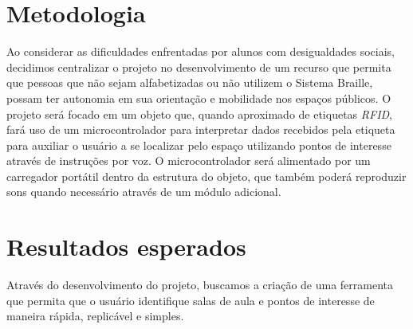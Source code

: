 \documentclass{article}
\begin{document}
\section{Metodologia}
Ao considerar as dificuldades enfrentadas por alunos com desigualdades sociais, decidimos centralizar o projeto no desenvolvimento de um recurso que permita que pessoas que não sejam alfabetizadas ou não utilizem o Sistema Braille, possam ter autonomia em sua orientação e mobilidade nos espaços públicos.
O projeto será focado em um objeto que, quando aproximado de etiquetas \emph{RFID}, fará uso de um microcontrolador para interpretar dados recebidos pela etiqueta para auxiliar o usuário a se localizar pelo espaço utilizando pontos de interesse através de instruções por voz.
O microcontrolador será alimentado por um carregador portátil dentro da estrutura do objeto, que também poderá reproduzir sons quando necessário através de um módulo adicional.
\section{Resultados esperados}
Através do desenvolvimento do projeto, buscamos a criação de uma ferramenta que permita que o usuário identifique salas de aula e pontos de interesse de maneira rápida, replicável e simples.
\end{document}
